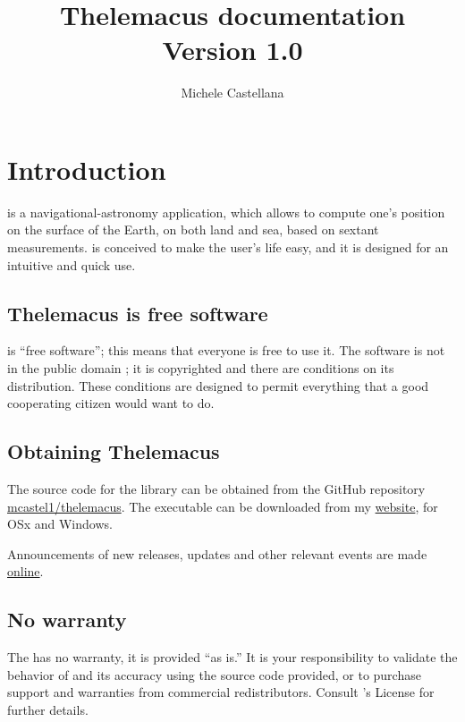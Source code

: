 \documentclass[]{book}
\title{Thelemacus documentation\\
\large{Version 1.0}}
\author{Michele Castellana}
\begin{document}
 

\maketitle 

\pagebreak
\tableofcontents

\chapter{Introduction}

\thel  is a navigational-astronomy application, which allows to compute one's position on the surface of the Earth, on both land and sea, based on sextant measurements. \thel is conceived to make the user's life easy, and it is designed for an intuitive and quick use. 

\section{Thelemacus is free software}

\thel is ``free software''; this means that everyone is free to use it. The software is not in the public domain \cite{castellana2024thelemacus}; it is copyrighted and there are conditions on its distribution. These conditions are designed to permit everything that a good cooperating citizen would want to do.

\section{Obtaining Thelemacus}

The source code for the library can be obtained from the GitHub repository \href{https://github.com/mcastel1/thelemacus}{mcastel1/thelemacus}. The executable can be downloaded from my \href{https://sites.google.com/site/michelecastellana/home}{website}, for OSx and Windows.  

Announcements of new releases, updates and other relevant events are made \href{https://sites.google.com/site/michelecastellana/home}{online}. 

\section{No warranty}

The \thel has no warranty, it is provided ``as is.'' It is your responsibility to validate the behavior of \thel and its accuracy using the source code provided, or to purchase support and warranties from commercial redistributors. Consult \thel's  License for further details.
\end{document}
